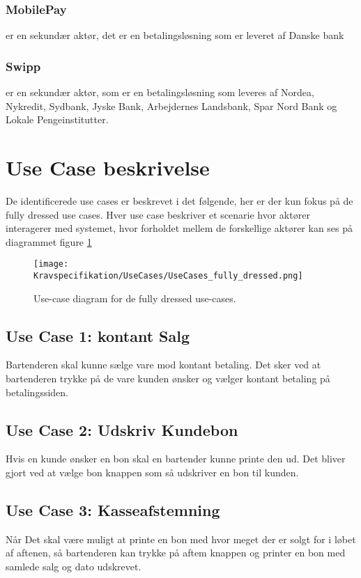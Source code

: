 \subsubsection*{MobilePay} 
er en sekundær aktør, det er en betalingsløsning som er leveret af Danske bank

\subsubsection*{Swipp} 
er en sekundær aktør, som er en betalingsløsning som leveres af Nordea, Nykredit, Sydbank, Jyske Bank, Arbejdernes Landsbank, Spar Nord Bank og Lokale Pengeinstitutter.  

\newpage

\section{Use Case beskrivelse}
De identificerede use cases er beskrevet i det følgende, her er der kun fokus på de fully dressed use cases. Hver use case beskriver et scenarie hvor aktører interagerer med systemet, hvor forholdet mellem de forskellige aktører kan ses på diagrammet figure \ref{fig:fullydressedusecases}

\begin{figure}[H]
	\centering
	\texttt{[image: Kravspecifikation/UseCases/UseCases\_fully\_dressed.png]}
	\caption{Use-case diagram for de fully dressed use-cases.}
	\label{fig:fullydressedusecases}
\end{figure} 

\subsection*{Use Case 1: kontant Salg}
Bartenderen skal kunne sælge vare mod kontant betaling. Det sker ved at bartenderen trykke på de vare kunden ønsker og vælger kontant betaling på betalingssiden. 


\subsection*{Use Case 2: Udskriv Kundebon}
Hvis en kunde ønsker en bon skal en bartender kunne printe den ud. Det bliver gjort ved at vælge bon knappen som så udskriver en bon til kunden. 

\subsection*{Use Case 3: Kasseafstemning}
Når Det skal være muligt at printe en bon med hvor meget der er solgt for i løbet af aftenen, så bartenderen kan trykke på aftem knappen og printer en bon med samlede salg og dato udskrevet. 

